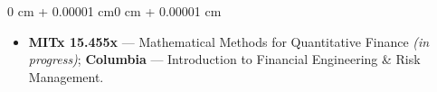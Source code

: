 \documentclass[10pt, letterpaper]{article}
\newenvironment{highlights}{
    \begin{itemize}[
        topsep=0.10 cm,
        parsep=0.10 cm,
        partopsep=0pt,
        itemsep=0pt,
        leftmargin=0 cm + 10pt
    ]
}{
    \end{itemize}
}
\newenvironment{onecolentry}{
    \begin{adjustwidth}{0 cm + 0.00001 cm}{0 cm + 0.00001 cm}
}{
    \end{adjustwidth}
}
\begin{document}
\vspace{0.08 cm}

\begin{onecolentry}
  \begin{highlights}
    \item \textbf{MITx 15.455x} --- Mathematical Methods for Quantitative Finance \textit{(in progress)}; \textbf{Columbia} --- Introduction to Financial Engineering \& Risk Management.
  \end{highlights}
\end{onecolentry}
\end{document}
